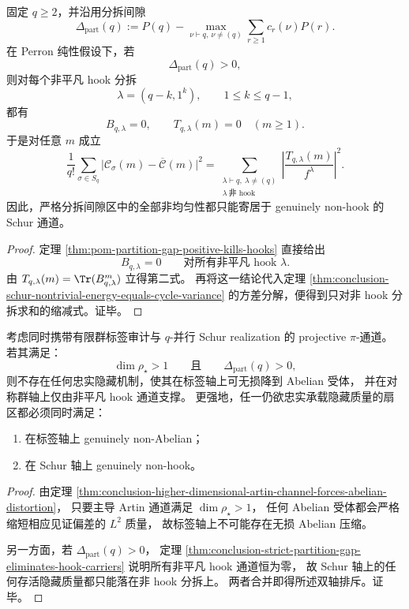 \begin{theorem}\label{thm:conclusion-strict-partition-gap-eliminates-hook-carriers}
固定 \(q\ge 2\)，并沿用分拆间隙
\[
\Delta_{\mathrm{part}}(q)
:=
P(q)-\max_{\nu\vdash q,\ \nu\neq(q)}
\sum_{r\ge 1}c_r(\nu)P(r).
\]
在 Perron 纯性假设下，若
\[
\Delta_{\mathrm{part}}(q)>0,
\]
则对每个非平凡 hook 分拆
\[
\lambda=(q-k,1^k),
\qquad
1\le k\le q-1,
\]
都有
\[
B_{q,\lambda}=0,
\qquad
T_{q,\lambda}(m)=0\quad (m\ge 1).
\]
于是对任意 \(m\) 成立
\[
\frac{1}{q!}\sum_{\sigma\in S_q}
\bigl|\mathcal C_\sigma(m)-\overline{\mathcal C}(m)\bigr|^2
=
\sum_{\substack{\lambda\vdash q,\ \lambda\neq(q)\\ \lambda\ \text{非 hook}}}
\left|\frac{T_{q,\lambda}(m)}{f^\lambda}\right|^2.
\]
因此，严格分拆间隙区中的全部非均匀性都只能寄居于 genuinely non-hook 的 Schur 通道。
\end{theorem}
\begin{proof}
定理 \ref{thm:pom-partition-gap-positive-kills-hooks} 直接给出
\[
B_{q,\lambda}=0
\qquad
\text{对所有非平凡 hook }\lambda.
\]
由 \(T_{q,\lambda}(m)=\Tr(B_{q,\lambda}^m)\) 立得第二式。
再将这一结论代入定理
\ref{thm:conclusion-schur-nontrivial-energy-equals-cycle-variance}
的方差分解，便得到只对非 hook 分拆求和的缩减式。证毕。
\end{proof}

\begin{theorem}\label{thm:conclusion-faithful-hidden-sector-must-be-nonabelian-and-nonhook}
考虑同时携带有限群标签审计与 \(q\)-并行 Schur realization 的 projective \(\pi\)-通道。
若其满足：
\[
\dim\rho_\star>1
\qquad\text{且}\qquad
\Delta_{\mathrm{part}}(q)>0,
\]
则不存在任何忠实隐藏机制，使其在标签轴上可无损降到 Abelian 受体，
并在对称群轴上仅由非平凡 hook 通道支撑。
更强地，任一仍欲忠实承载隐藏质量的扇区都必须同时满足：
\begin{enumerate}
  \item 在标签轴上 genuinely non-Abelian；
  \item 在 Schur 轴上 genuinely non-hook。
\end{enumerate}
\end{theorem}
\begin{proof}
由定理 \ref{thm:conclusion-higher-dimensional-artin-channel-forces-abelian-distortion}，
只要主导 Artin 通道满足 \(\dim\rho_\star>1\)，
任何 Abelian 受体都会严格缩短相应见证偏差的 \(L^2\) 质量，
故标签轴上不可能存在无损 Abelian 压缩。

另一方面，若 \(\Delta_{\mathrm{part}}(q)>0\)，
定理 \ref{thm:conclusion-strict-partition-gap-eliminates-hook-carriers}
说明所有非平凡 hook 通道恒为零，
故 Schur 轴上的任何存活隐藏质量都只能落在非 hook 分拆上。
两者合并即得所述双轴排斥。证毕。
\end{proof}

